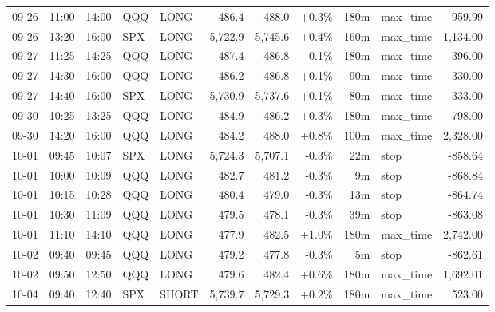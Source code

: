 \documentclass[11pt,a4paper,twoside]{article}
\begin{document}
\begin{center}
\begin{longtable}{>{\color{txtmain}}l l l l l r r r r >{\color{txtmain}}l r}
09-26 & 11:00 & 14:00 & QQQ & LONG & 486.4 & 488.0 & \textcolor{wingreen}{+0.3\%} & 180m & max\_time & \textcolor{wingreen}{959.99} \\
09-26 & 13:20 & 16:00 & SPX & LONG & 5,722.9 & 5,745.6 & \textcolor{wingreen}{+0.4\%} & 160m & max\_time & \textcolor{wingreen}{1,134.00} \\
09-27 & 11:25 & 14:25 & QQQ & LONG & 487.4 & 486.8 & \textcolor{lossred}{-0.1\%} & 180m & max\_time & \textcolor{lossred}{-396.00} \\
09-27 & 14:30 & 16:00 & QQQ & LONG & 486.2 & 486.8 & \textcolor{wingreen}{+0.1\%} & 90m & max\_time & \textcolor{wingreen}{330.00} \\
09-27 & 14:40 & 16:00 & SPX & LONG & 5,730.9 & 5,737.6 & \textcolor{wingreen}{+0.1\%} & 80m & max\_time & \textcolor{wingreen}{333.00} \\
09-30 & 10:25 & 13:25 & QQQ & LONG & 484.9 & 486.2 & \textcolor{wingreen}{+0.3\%} & 180m & max\_time & \textcolor{wingreen}{798.00} \\
09-30 & 14:20 & 16:00 & QQQ & LONG & 484.2 & 488.0 & \textcolor{wingreen}{+0.8\%} & 100m & max\_time & \textcolor{wingreen}{2,328.00} \\
10-01 & 09:45 & 10:07 & SPX & LONG & 5,724.3 & 5,707.1 & \textcolor{lossred}{-0.3\%} & 22m & stop & \textcolor{lossred}{-858.64} \\
10-01 & 10:00 & 10:09 & QQQ & LONG & 482.7 & 481.2 & \textcolor{lossred}{-0.3\%} & 9m & stop & \textcolor{lossred}{-868.84} \\
10-01 & 10:15 & 10:28 & QQQ & LONG & 480.4 & 479.0 & \textcolor{lossred}{-0.3\%} & 13m & stop & \textcolor{lossred}{-864.74} \\
10-01 & 10:30 & 11:09 & QQQ & LONG & 479.5 & 478.1 & \textcolor{lossred}{-0.3\%} & 39m & stop & \textcolor{lossred}{-863.08} \\
10-01 & 11:10 & 14:10 & QQQ & LONG & 477.9 & 482.5 & \textcolor{wingreen}{+1.0\%} & 180m & max\_time & \textcolor{wingreen}{2,742.00} \\
10-02 & 09:40 & 09:45 & QQQ & LONG & 479.2 & 477.8 & \textcolor{lossred}{-0.3\%} & 5m & stop & \textcolor{lossred}{-862.61} \\
10-02 & 09:50 & 12:50 & QQQ & LONG & 479.6 & 482.4 & \textcolor{wingreen}{+0.6\%} & 180m & max\_time & \textcolor{wingreen}{1,692.01} \\
10-04 & 09:40 & 12:40 & SPX & SHORT & 5,739.7 & 5,729.3 & \textcolor{wingreen}{+0.2\%} & 180m & max\_time & \textcolor{wingreen}{523.00} \\

\end{longtable}
\end{center}
\end{document}
